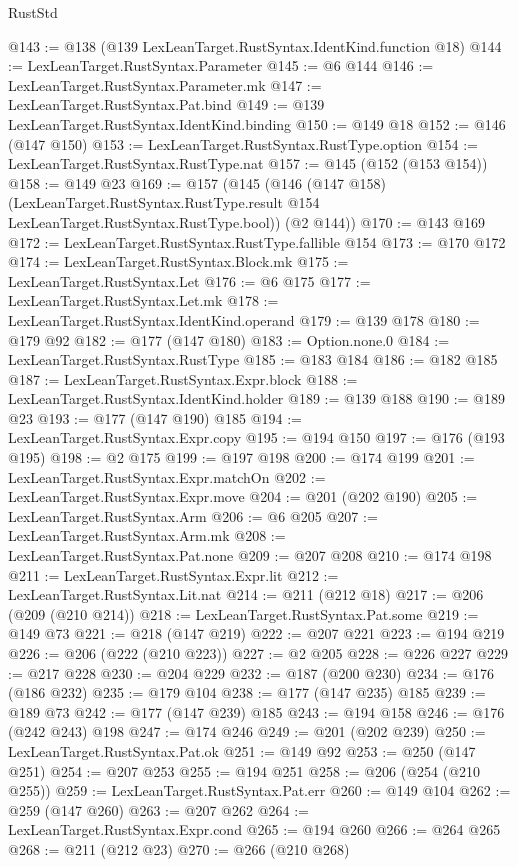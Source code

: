 \begin{lexlean}{RustStd}
\begin{coremodule}
@143 := @138 (@139 LexLeanTarget.RustSyntax.IdentKind.function @18)
@144 := LexLeanTarget.RustSyntax.Parameter
@145 := @6 @144
@146 := LexLeanTarget.RustSyntax.Parameter.mk
@147 := LexLeanTarget.RustSyntax.Pat.bind
@149 := @139 LexLeanTarget.RustSyntax.IdentKind.binding
@150 := @149 @18
@152 := @146 (@147 @150)
@153 := LexLeanTarget.RustSyntax.RustType.option
@154 := LexLeanTarget.RustSyntax.RustType.nat
@157 := @145 (@152 (@153 @154))
@158 := @149 @23
@169 := @157
    (@145
      (@146
        (@147 @158)
        (LexLeanTarget.RustSyntax.RustType.result @154 LexLeanTarget.RustSyntax.RustType.bool))
      (@2 @144))
@170 := @143 @169
@172 := LexLeanTarget.RustSyntax.RustType.fallible @154
@173 := @170 @172
@174 := LexLeanTarget.RustSyntax.Block.mk
@175 := LexLeanTarget.RustSyntax.Let
@176 := @6 @175
@177 := LexLeanTarget.RustSyntax.Let.mk
@178 := LexLeanTarget.RustSyntax.IdentKind.operand
@179 := @139 @178
@180 := @179 @92
@182 := @177 (@147 @180)
@183 := Option.none.{0}
@184 := LexLeanTarget.RustSyntax.RustType
@185 := @183 @184
@186 := @182 @185
@187 := LexLeanTarget.RustSyntax.Expr.block
@188 := LexLeanTarget.RustSyntax.IdentKind.holder
@189 := @139 @188
@190 := @189 @23
@193 := @177 (@147 @190) @185
@194 := LexLeanTarget.RustSyntax.Expr.copy
@195 := @194 @150
@197 := @176 (@193 @195)
@198 := @2 @175
@199 := @197 @198
@200 := @174 @199
@201 := LexLeanTarget.RustSyntax.Expr.matchOn
@202 := LexLeanTarget.RustSyntax.Expr.move
@204 := @201 (@202 @190)
@205 := LexLeanTarget.RustSyntax.Arm
@206 := @6 @205
@207 := LexLeanTarget.RustSyntax.Arm.mk
@208 := LexLeanTarget.RustSyntax.Pat.none
@209 := @207 @208
@210 := @174 @198
@211 := LexLeanTarget.RustSyntax.Expr.lit
@212 := LexLeanTarget.RustSyntax.Lit.nat
@214 := @211 (@212 @18)
@217 := @206 (@209 (@210 @214))
@218 := LexLeanTarget.RustSyntax.Pat.some
@219 := @149 @73
@221 := @218 (@147 @219)
@222 := @207 @221
@223 := @194 @219
@226 := @206 (@222 (@210 @223))
@227 := @2 @205
@228 := @226 @227
@229 := @217 @228
@230 := @204 @229
@232 := @187 (@200 @230)
@234 := @176 (@186 @232)
@235 := @179 @104
@238 := @177 (@147 @235) @185
@239 := @189 @73
@242 := @177 (@147 @239) @185
@243 := @194 @158
@246 := @176 (@242 @243) @198
@247 := @174 @246
@249 := @201 (@202 @239)
@250 := LexLeanTarget.RustSyntax.Pat.ok
@251 := @149 @92
@253 := @250 (@147 @251)
@254 := @207 @253
@255 := @194 @251
@258 := @206 (@254 (@210 @255))
@259 := LexLeanTarget.RustSyntax.Pat.err
@260 := @149 @104
@262 := @259 (@147 @260)
@263 := @207 @262
@264 := LexLeanTarget.RustSyntax.Expr.cond
@265 := @194 @260
@266 := @264 @265
@268 := @211 (@212 @23)
@270 := @266 (@210 @268)

\end{coremodule}
\end{lexlean}
